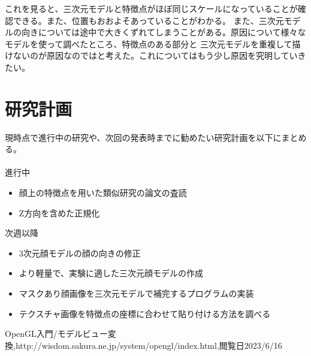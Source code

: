 \documentclass[]{jarticle}          %
\begin{document}
これを見ると、三次元モデルと特徴点がほぼ同じスケールになっていることが確認できる。また、位置もおおよそあっていることがわかる。
また、三次元モデルの向きについては途中で大きくずれてしまうことがある。原因について様々なモデルを使って調べたところ、特徴点のある部分と
三次元モデルを重複して描けないのが原因なのではと考えた。これについてはもう少し原因を究明していきたい。
\section{研究計画}
現時点で進行中の研究や、次回の発表時までに勧めたい研究計画を以下にまとめる。\\
\\
進行中
\begin{itemize}
  \item 顔上の特徴点を用いた類似研究の論文の査読
  \item Z方向を含めた正規化
\end{itemize}
次週以降
\begin{itemize}
  \item 3次元顔モデルの顔の向きの修正
  \item より軽量で、実験に適した三次元顔モデルの作成
  \item マスクあり顔画像を三次元モデルで補完するプログラムの実装
  \item テクスチャ画像を特徴点の座標に合わせて貼り付ける方法を調べる
\end{itemize}

\begin{thebibliography}{99}
 OpenGL入門/モデルビュー変換,http://wisdom.sakura.ne.jp/system/opengl/index.html,閲覧日2023/6/16
\end{thebibliography}
\end{document}
